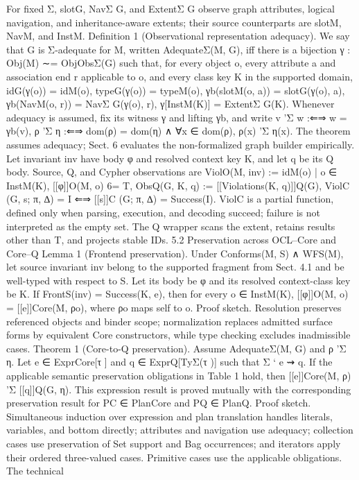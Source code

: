 For fixed Σ, slotG, NavΣ
G, and ExtentΣ
G observe graph attributes, logical navigation,
and inheritance-aware extents; their source counterparts are slotM, NavM, and InstM.
Definition 1 (Observational representation adequacy). We say that G is Σ-adequate
for M, written AdequateΣ(M, G), iff there is a bijection γ : Obj(M) ∼= ObjObsΣ(G)
such that, for every object o, every attribute a and association end r applicable to o,
and every class key K in the supported domain,
idG(γ(o)) = idM(o), typeG(γ(o)) = typeM(o),
γb(slotM(o, a)) = slotG(γ(o), a),
γb(NavM(o, r)) = NavΣ
G(γ(o), r), γ[InstM(K)] = ExtentΣ
G(K).
Whenever adequacy is assumed, fix its witness γ and lifting γb, and write
v 'Σ w :⇐⇒ w = γb(v),
ρ 'Σ η :⇐⇒ dom(ρ) = dom(η) ∧ ∀x ∈ dom(ρ), ρ(x) 'Σ η(x).
The theorem assumes adequacy; Sect. 6 evaluates the non-formalized graph builder
empirically.
Let invariant inv have body φ and resolved context key K, and let q be its Q body.
Source, Q, and Cypher observations are
ViolO(M, inv) := {idM(o) | o ∈ InstM(K), [[φ]]O(M, o) 6= T},
ObsQ(G, K, q) := [[Violations(K, q)]]Q(G),
ViolC (G, s; π, ∆) = I ⇐⇒ [[s]]C (G; π, ∆) = Success(I).
ViolC is a partial function, defined only when parsing, execution, and decoding succeed;
failure is not interpreted as the empty set. The Q wrapper scans the extent, retains results
other than T, and projects stable IDs.
5.2 Preservation across OCL–Core and Core–Q
Lemma 1 (Frontend preservation). Under Conforms(M, S) ∧ WFS(M), let source
invariant inv belong to the supported fragment from Sect. 4.1 and be well-typed with
respect to S. Let its body be φ and its resolved context-class key be K. If FrontS(inv) =
Success(K, e), then for every o ∈ InstM(K),
[[φ]]O(M, o) = [[e]]Core(M, ρo),
where ρo maps self to o.
Proof sketch. Resolution preserves referenced objects and binder scope; normalization
replaces admitted surface forms by equivalent Core constructors, while type checking
excludes inadmissible cases.
Theorem 1 (Core-to-Q preservation). Assume AdequateΣ(M, G) and ρ 'Σ η. Let
e ∈ ExprCore[τ ] and q ∈ ExprQ[TyΣ(τ )] such that Σ ` e ⇝ q. If the applicable
semantic preservation obligations in Table 1 hold, then
[[e]]Core(M, ρ) 'Σ [[q]]Q(G, η).
This expression result is proved mutually with the corresponding preservation result for
PC ∈ PlanCore and PQ ∈ PlanQ.
Proof sketch. Simultaneous induction over expression and plan translation handles literals, variables, and bottom directly; attributes and navigation use adequacy; collection
cases use preservation of Set support and Bag occurrences; and iterators apply their ordered three-valued cases. Primitive cases use the applicable obligations. The technical
